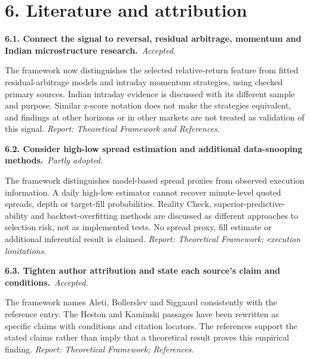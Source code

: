 \documentclass[11pt,a4paper]{article}
\newcommand{\Needspace}[1]{\par\begingroup\ifdim\dimexpr\pagegoal-\pagetotal\relax<#1\relax\newpage\fi\endgroup}
\newcommand{\reply}[3]{\par\addvspace{5pt}\noindent\textbf{#1. #2}\ \textit{#3.}\par\nobreak}
\begin{document}
\Needspace{10\baselineskip}
\section*{6. Literature and attribution}
\par\noindent\begin{minipage}{\linewidth}\justifying
\reply{6.1}{Connect the signal to reversal, residual arbitrage, momentum and Indian microstructure research.}{Accepted}
The framework now distinguishes the selected relative-return feature from fitted residual-arbitrage models and intraday momentum strategies, using checked primary sources. Indian intraday evidence is discussed with its different sample and purpose. Similar z-score notation does not make the strategies equivalent, and findings at other horizons or in other markets are not treated as validation of this signal.
{\small\textit{Report: Theoretical Framework and References.}}
\end{minipage}\par\addvspace{5pt}

\par\noindent\begin{minipage}{\linewidth}\justifying
\reply{6.2}{Consider high-low spread estimation and additional data-snooping methods.}{Partly adopted}
The framework distinguishes model-based spread proxies from observed execution information. A daily high-low estimator cannot recover minute-level quoted spreads, depth or target-fill probabilities. Reality Check, superior-predictive-ability and backtest-overfitting methods are discussed as different approaches to selection risk, not as implemented tests. No spread proxy, fill estimate or additional inferential result is claimed.
{\small\textit{Report: Theoretical Framework; execution limitations.}}
\end{minipage}\par\addvspace{5pt}

\par\noindent\begin{minipage}{\linewidth}\justifying
\reply{6.3}{Tighten author attribution and state each source's claim and conditions.}{Accepted}
The framework names Aleti, Bollerslev and Siggaard consistently with the reference entry. The Heston and Kaminski passages have been rewritten as specific claims with conditions and citation locators. The references support the stated claims rather than imply that a theoretical result proves this empirical finding.
{\small\textit{Report: Theoretical Framework; References.}}
\end{minipage}\par\addvspace{5pt}
\end{document}
